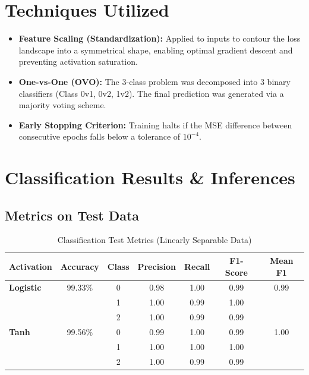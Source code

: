 \documentclass[12pt, a4paper]{article}
\begin{document}
\section{Techniques Utilized}
\begin{itemize}
    \item \textbf{Feature Scaling (Standardization):} Applied to inputs to contour the loss landscape into a symmetrical shape, enabling optimal gradient descent and preventing activation saturation.
    \item \textbf{One-vs-One (OVO):} The 3-class problem was decomposed into 3 binary classifiers (Class 0v1, 0v2, 1v2). The final prediction was generated via a majority voting scheme.
    \item \textbf{Early Stopping Criterion:} Training halts if the MSE difference between consecutive epochs falls below a tolerance of $10^{-4}$.
\end{itemize}

\newpage
\section{Classification Results \& Inferences}

\subsection{Metrics on Test Data}

\begin{table}[H]
\centering
\caption{Classification Test Metrics (Linearly Separable Data)}
\begin{tabular}{lcccccc}
\toprule
\textbf{Activation} & \textbf{Accuracy} & \textbf{Class} & \textbf{Precision} & \textbf{Recall} & \textbf{F1-Score} & \textbf{Mean F1} \\ \midrule
\textbf{Logistic} & 99.33\% & 0 & 0.98 & 1.00 & 0.99 & 0.99 \\ 
 & & 1 & 1.00 & 0.99 & 1.00 & \\
 & & 2 & 1.00 & 0.99 & 0.99 & \\ \midrule
\textbf{Tanh} & 99.56\% & 0 & 0.99 & 1.00 & 0.99 & 1.00 \\ 
 & & 1 & 1.00 & 1.00 & 1.00 & \\
 & & 2 & 1.00 & 0.99 & 0.99 & \\ \bottomrule
\end{tabular}
\end{table}
\end{document}
